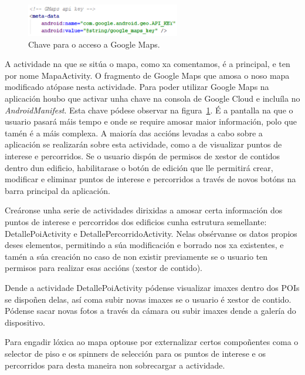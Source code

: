 \begin{figure}[h]
	\begin{center}
		\includegraphics[width=0.6\textwidth]{figures/codigo/chaveGoogleMaps}
		\caption{Chave para o acceso a Google Maps.}
		\label{fig:chaveGoogleMaps}
	\end{center}
\end{figure}

A actividade na que se sitúa o mapa, como xa comentamos, é a principal, e ten por nome MapaActivity. O fragmento de Google Maps que amosa o noso mapa modificado atópase nesta actividade. Para poder utilizar Google Maps na aplicación houbo que activar unha chave na consola de Google Cloud \cite{chaveGoogleMaps} e incluíla no \emph{AndroidManifest}. Esta chave pódese observar na figura~\ref{fig:chaveGoogleMaps}. É a pantalla na que o usuario pasará máis tempo e onde se require amosar maior información, polo que tamén é a máis complexa. A maioría das accións levadas a cabo sobre a aplicación se realizarán sobre esta actividade, como a de visualizar puntos de interese e percorridos. Se o usuario dispón de permisos de xestor de contidos dentro dun edificio, habilitarase o botón de edición que lle permitirá crear, modificar e eliminar puntos de interese e percorridos a través de novos botóns na barra principal da aplicación.

Creáronse unha serie de actividades dirixidas a amosar certa información dos puntos de interese e percorridos dos edificios cunha estrutura semellante: DetallePoiActivity e DetallePercorridoActivity. Nelas obsérvanse os datos propios deses elementos, permitindo a súa modificación e borrado nos xa existentes, e tamén a súa creación no caso de non existir previamente se o usuario ten permisos para realizar esas accións (xestor de contido).

Dende a actividade DetallePoiActivity pódense visualizar imaxes dentro dos POIs se dispoñen delas, así coma subir novas imaxes se o usuario é xestor de contido. Pódense sacar novas fotos a través da cámara ou subir imaxes dende a galería do dispositivo.

Para engadir lóxica ao mapa optouse por externalizar certos compoñentes coma o selector de piso e os spinners de selección para os puntos de interese e os percorridos para desta maneira non sobrecargar a actividade.

